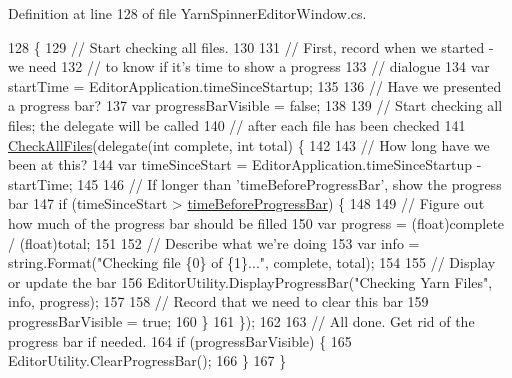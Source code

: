 Definition at line 128 of file Yarn\-Spinner\-Editor\-Window.\-cs.


\begin{DoxyCode}
128                                  \{
129             \textcolor{comment}{// Start checking all files.}
130 
131             \textcolor{comment}{// First, record when we started - we need}
132             \textcolor{comment}{// to know if it's time to show a progress}
133             \textcolor{comment}{// dialogue}
134             var startTime = EditorApplication.timeSinceStartup;
135 
136             \textcolor{comment}{// Have we presented a progress bar?}
137             var progressBarVisible = \textcolor{keyword}{false};
138 
139             \textcolor{comment}{// Start checking all files; the delegate will be called}
140             \textcolor{comment}{// after each file has been checked}
141             \hyperlink{a00164_a8e59ec20bd21bb1f8a6d4f02980f624b}{CheckAllFiles}(delegate(\textcolor{keywordtype}{int} complete, \textcolor{keywordtype}{int} total) \{
142 
143                 \textcolor{comment}{// How long have we been at this?}
144                 var timeSinceStart = EditorApplication.timeSinceStartup - startTime;
145 
146                 \textcolor{comment}{// If longer than 'timeBeforeProgressBar', show the progress bar}
147                 \textcolor{keywordflow}{if} (timeSinceStart > \hyperlink{a00164_a62a14b3fbaf2da41154ebad0eb7b6d3f}{timeBeforeProgressBar}) \{
148 
149                     \textcolor{comment}{// Figure out how much of the progress bar should be filled}
150                     var progress = (float)complete / (\textcolor{keywordtype}{float})total;
151 
152                     \textcolor{comment}{// Describe what we're doing}
153                     var info = string.Format(\textcolor{stringliteral}{"Checking file \{0\} of \{1\}..."}, complete, total);
154 
155                     \textcolor{comment}{// Display or update the bar}
156                     EditorUtility.DisplayProgressBar(\textcolor{stringliteral}{"Checking Yarn Files"}, info, progress);
157 
158                     \textcolor{comment}{// Record that we need to clear this bar}
159                     progressBarVisible = \textcolor{keyword}{true};
160                 \}
161             \});
162 
163             \textcolor{comment}{// All done. Get rid of the progress bar if needed.}
164             \textcolor{keywordflow}{if} (progressBarVisible) \{
165                 EditorUtility.ClearProgressBar();
166             \}
167         \}
\end{DoxyCode}
